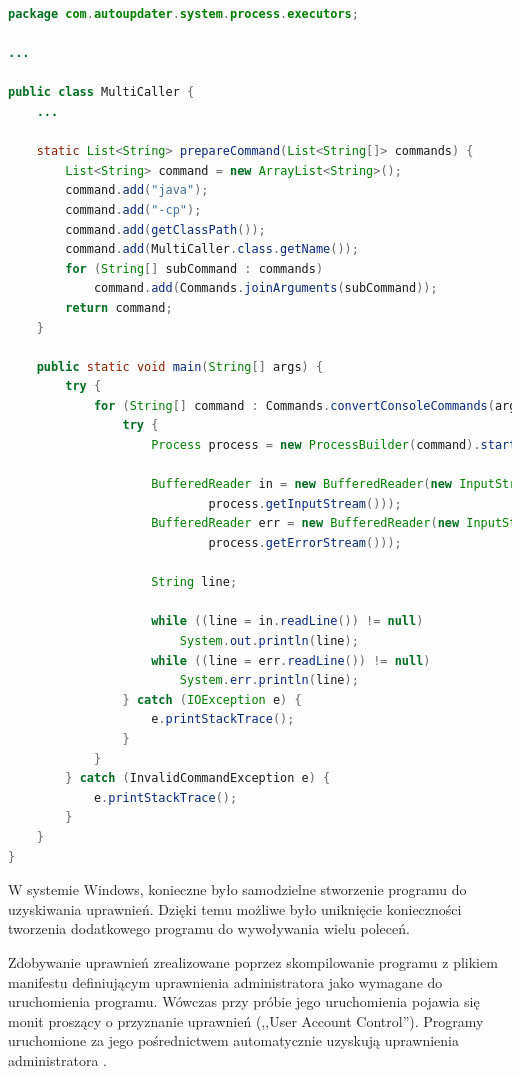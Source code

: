\documentclass[polish,12pt,titlepage]{article}
\begin{document}
\begin{lstlisting}[language=Java, frame=lines, numberstyle=\tiny, stepnumber=5, caption=Implementacja \texttt{MultiCaller}., firstnumber=1]
package com.autoupdater.system.process.executors;

...

public class MultiCaller {
    ...

    static List<String> prepareCommand(List<String[]> commands) {
        List<String> command = new ArrayList<String>();
        command.add("java");
        command.add("-cp");
        command.add(getClassPath());
        command.add(MultiCaller.class.getName());
        for (String[] subCommand : commands)
            command.add(Commands.joinArguments(subCommand));
        return command;
    }

    public static void main(String[] args) {
        try {
            for (String[] command : Commands.convertConsoleCommands(args)) {
                try {
                    Process process = new ProcessBuilder(command).start();

                    BufferedReader in = new BufferedReader(new InputStreamReader(
                            process.getInputStream()));
                    BufferedReader err = new BufferedReader(new InputStreamReader(
                            process.getErrorStream()));

                    String line;

                    while ((line = in.readLine()) != null)
                        System.out.println(line);
                    while ((line = err.readLine()) != null)
                        System.err.println(line);
                } catch (IOException e) {
                    e.printStackTrace();
                }
            }
        } catch (InvalidCommandException e) {
            e.printStackTrace();
        }
    }
}
\end{lstlisting}

W systemie Windows, konieczne było samodzielne stworzenie programu do
uzyskiwania uprawnień. Dzięki temu możliwe było uniknięcie konieczności
tworzenia dodatkowego programu do wywoływania wielu poleceń.

Zdobywanie uprawnień zrealizowane poprzez skompilowanie programu z plikiem
manifestu definiującym uprawnienia administratora jako wymagane do
uruchomienia programu. Wówczas przy próbie jego uruchomienia pojawia się
monit proszący o przyznanie uprawnień (,,User Account Control''). Programy
uruchomione za jego pośrednictwem automatycznie uzyskują uprawnienia
administratora \cite{JAVA_VISTA_UPRAWNIENIA,MS_VISTA_UPRAWNIENIA}.
\end{document}
